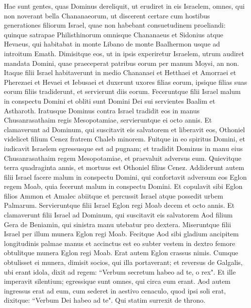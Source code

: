 
\begin{biblechapter}  
\verse Hae sunt gentes, quas Dominus dereliquit, ut erudiret in eis Israelem, omnes, qui non noverant bella Chananaeorum, 
\verse ut discerent certare cum hostibus generationes filiorum Israel, quae non habebant consuetudinem proeliandi: 
\verse quinque satrapae Philisthinorum omnisque Chananaeus et Sidonius atque Hevaeus, qui habitabat in monte Libano de monte Baalhermon usque ad introitum Emath. 
\verse Dimisitque eos, ut in ipsis experiretur Israelem, utrum audiret mandata Domini, quae praeceperat patribus eorum per manum Moysi, an non. 
\verse Itaque filii Israel habitaverunt in medio Chananaei et Hetthaei et Amorraei et Pherezaei et Hevaei et Iebusaei 
\verse et duxerunt uxores filias eorum, ipsique filias suas eorum filiis tradiderunt, et servierunt diis eorum. 
\verse Feceruntque filii Israel malum in conspectu Domini et obliti sunt Domini Dei sui servientes Baalim et Astharoth. 
\verse Iratusque Dominus contra Israel tradidit eos in manus Chusanrasathaim regis Mesopotamiae, servieruntque ei octo annis. 
\verse Et clamaverunt ad Dominum, qui suscitavit eis salvatorem et liberavit eos, Othoniel videlicet filium Cenez fratrem Chaleb minorem. 
\verse Fuitque in eo spiritus Domini, et iudicavit Israelem egressusque est ad pugnam; et tradidit Dominus in manu eius Chusanrasathaim regem Mesopotamiae, et praevaluit adversus eum. 
\verse Quievitque terra quadraginta annis, et mortuus est Othoniel filius Cenez. 
\verse Addiderunt autem filii Israel facere malum in conspectu Domini, qui confortavit adversum eos Eglon regem Moab, quia fecerunt malum in conspectu Domini. 
\verse Et copulavit sibi Eglon filios Ammon et Amalec abiitque et percussit Israel atque possedit urbem Palmarum. 
\verse Servieruntque filii Israel Eglon regi Moab decem et octo annis. 
\verse Et clamaverunt filii Israel ad Dominum, qui suscitavit eis salvatorem Aod filium Gera de Beniamin, qui sinistra manu utebatur pro dextera. Miseruntque filii Israel per illum munera Eglon regi Moab. 
\verse Fecitque Aod sibi gladium ancipitem longitudinis palmae manus et accinctus est eo subter vestem in dextro femore 
\verse obtulitque munera Eglon regi Moab. Erat autem Eglon crassus nimis.  
\verse Cumque obtulisset ei munera, dimisit socios, qui illa portaverant; 
\verse et reversus de Galgalis, ubi erant idola, dixit ad regem: “Verbum secretum habeo ad te, o rex". Et ille imperavit silentium; egressique sunt omnes, qui circa eum erant. 
\verse Aod autem ingressus erat ad eum, cum sederet in aestivo cenaculo, quod ipsi soli erat, dixitque: “Verbum Dei habeo ad te". Qui statim surrexit de throno. 

\end{biblechapter}
